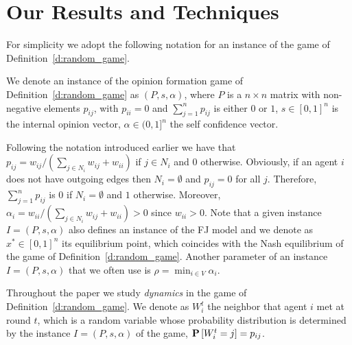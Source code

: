 \section{Our Results and Techniques}

For simplicity we adopt the following notation for
an instance of the game of Definition~\ref{d:random_game}.
%
\begin{definition}\label{d:instance}
  We denote an instance of the opinion formation game of Definition~\ref{d:random_game}
  as $(P,s,\alpha)$, where
    $P$ is a $n \times n$  matrix with non-negative elements $p_{ij}$,
      with $p_{ii}=0$ and $\sum_{j=1}^n p_{ij}$ is either $0$ or $1$,
    $s \in [0,1]^n$ is the internal opinion vector,
    $\alpha \in (0,1]^n$ the self confidence vector.
\end{definition}
%
Following the notation introduced earlier we have that
$p_{ij} = w_{ij}/(\sum_{j \in N_i}w_{ij}+w_{ii})$ if $j \in N_i$ and $0$ otherwise.
Obviously, if an agent $i$ does not have outgoing edges then $N_i = \emptyset$ and
$p_{ij} = 0$ for all $j$. Therefore, $\sum_{j=1}^n p_{ij}$ is $0$ if $N_i= \emptyset$
and $1$ otherwise.
Moreover, $\alpha_i=w_{ii}/(\sum_{j \in N_i}w_{ij}+w_{ii})>0$ since $w_{ii}>0$.
Note that a given instance $I=(P,s,\alpha)$ also defines an instance
of the FJ model and we denote as $x^* \in [0,1]^n$
its equilibrium point, which coincides with the Nash equilibrium
of the game of Definition~\ref{d:random_game}.
Another parameter of an instance $I=(P,s,\alpha)$ that we often use is
$\rho=\min_{i \in V}\alpha_i$. 



Throughout the paper we study \emph{dynamics}
in the game of Definition~\ref{d:random_game}.
We denote as $W_i^t$ the neighbor that agent $i$ met
at round $t$, which is a random variable whose
probability distribution is determined by the
instance $I=(P,s,\alpha)$ of the game, $\bm{\mathrm{P}}\left[W_i^t=j\right]=p_{ij}$.



